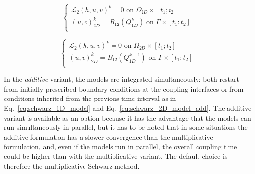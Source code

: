 \documentclass[Coupling]{../../data/TelemacDoc} %
\begin{document}
\begin{equation}
\left\lbrace
\begin{array}{l}
\mathcal{L}_2 (h,u,v)^{k} = 0 \textrm{ on } \Omega_{2D} \times [t_1;t_2]\\
(u,v)_{2D}^{k} = B_{12}(Q^{k}_{1D}) \textrm{ on } \Gamma \times [t_1;t_2] \\
\end{array}
\right.
\label{eq:schwarz_2D_model_multi}
\end{equation}

\begin{equation}
\left\lbrace
\begin{array}{l}
\mathcal{L}_2 (h,u,v)^{k} = 0 \textrm{ on } \Omega_{2D} \times [t_1;t_2]\\
(u,v)_{2D}^{k} = B_{12}(Q^{k-1}_{1D}) \textrm{ on } \Gamma \times [t_1;t_2] \\
\end{array}
\right.
\label{eq:schwarz_2D_model_add}
\end{equation}

In the \emph{additive} variant, the models are integrated simultaneously:
both restart from initially prescribed boundary conditions at the
coupling interfaces or from conditions inherited from the 
previous time interval as in Eq.~\ref{eq:schwarz_1D_model} and
Eq.~\ref{eq:schwarz_2D_model_add}. The additive variant is available
as an option because it has the advantage that the models can run 
simultaneously in parallel, but it has to be noted that in some
situations the additive formulation has a slower convergence than the
multiplicative formulation, and, even if the models run in
parallel, the overall coupling time could be higher than with the
multiplicative variant. The default choice is therefore the
multiplicative Schwarz method.
\end{document}
